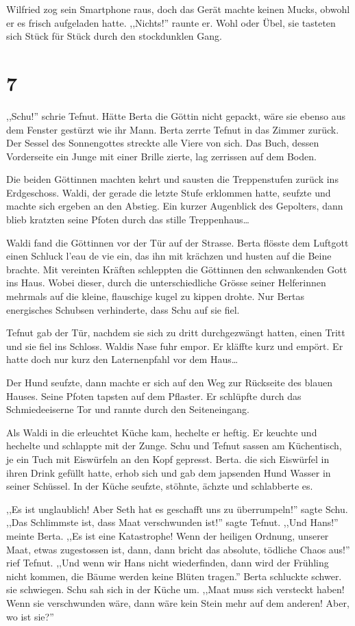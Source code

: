 Wilfried zog sein Smartphone raus, doch das Gerät machte keinen Mucks, obwohl er es frisch aufgeladen hatte. ,,Nichts!'' raunte er. Wohl oder Übel, sie tasteten sich Stück für Stück durch den stockdunklen Gang.

\section*{7}

,,Schu!'' schrie Tefnut. Hätte Berta die Göttin nicht gepackt, wäre sie ebenso aus dem Fenster gestürzt wie ihr Mann. Berta zerrte Tefnut in das Zimmer zurück. Der Sessel des Sonnengottes streckte alle Viere von sich. Das Buch, dessen Vorderseite ein Junge mit einer Brille zierte, lag zerrissen auf dem Boden. 

Die beiden Göttinnen machten kehrt und sausten die Treppenstufen zurück ins Erdgeschoss. Waldi, der gerade die letzte Stufe erklommen hatte, seufzte und machte sich ergeben an den Abstieg. Ein kurzer Augenblick des Gepolters, dann blieb kratzten seine Pfoten durch das stille Treppenhaus\dots

Waldi fand die Göttinnen vor der Tür auf der Strasse. Berta flösste dem Luftgott einen Schluck l'eau de vie ein, das ihn mit krächzen und husten auf die Beine brachte. Mit vereinten Kräften schleppten die Göttinnen den schwankenden Gott ins Haus. Wobei dieser, durch die unterschiedliche Grösse seiner Helferinnen mehrmals auf die kleine, flauschige kugel zu kippen drohte. Nur Bertas energisches Schubsen verhinderte, dass Schu auf sie fiel.

Tefnut gab der Tür, nachdem sie sich zu dritt durchgezwängt hatten, einen Tritt und sie fiel ins Schloss. Waldis Nase fuhr empor. Er kläffte kurz und empört. Er hatte doch nur kurz den Laternenpfahl vor dem Haus\dots

Der Hund seufzte, dann machte er sich auf den Weg zur Rückseite des blauen Hauses. Seine Pfoten tapsten auf dem Pflaster. Er schlüpfte durch das Schmiedeeiserne Tor und rannte durch den Seiteneingang.

Als Waldi in die erleuchtet Küche kam, hechelte er heftig. Er keuchte und hechelte und schlappte mit der Zunge. Schu und Tefnut sassen am Küchentisch, je ein Tuch mit Eiswürfeln an den Kopf gepresst. Berta. die sich Eiswürfel in ihren Drink gefüllt hatte, erhob sich und gab dem japsenden Hund Wasser in seiner Schüssel. In der Küche seufzte, stöhnte, ächzte und schlabberte es.

,,Es ist unglaublich! Aber Seth hat es geschafft uns zu überrumpeln!'' sagte Schu. ,,Das Schlimmste ist, dass Maat verschwunden ist!'' sagte Tefnut. ,,Und Hans!'' meinte Berta. ,,Es ist eine Katastrophe! Wenn der heiligen Ordnung, unserer Maat, etwas zugestossen ist, dann, dann bricht das absolute, tödliche Chaos aus!'' rief Tefnut. ,,Und wenn wir Hans nicht wiederfinden, dann wird der Frühling nicht kommen, die Bäume werden keine Blüten tragen.'' Berta schluckte schwer. sie schwiegen. Schu sah sich in der Küche um. ,,Maat muss sich versteckt haben! Wenn sie verschwunden wäre, dann wäre kein Stein mehr auf dem anderen! Aber, wo ist sie?''

